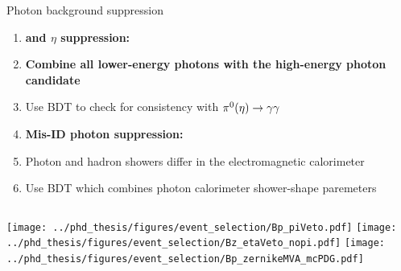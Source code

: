 \documentclass[xcolor=dvipsnames]{beamer}
\begin{document}
\begin{frame}{Photon background suppression}
   \centering\scriptsize
   \begin{enumerate}
      \item {\bf\large\piz and $\eta$ suppression:}\\
      \item[\ra] \textbf{Combine all lower-energy photons with the high-energy photon candidate}
      \item[\ra] Use BDT to check for consistency with $\pi^0(\eta)\rightarrow\gamma\gamma$\\
      \vspace{10pt}
      \item {\bf\large Mis-ID photon suppression:}\\
      \item[\ra] Photon and hadron showers differ in the electromagnetic calorimeter
      \item[\ra] Use BDT which combines photon calorimeter shower-shape paremeters 
  \end{enumerate}  
  \begin{columns}
   \texttt{[image: ../phd\_thesis/figures/event\_selection/Bp\_piVeto.pdf]}
   \texttt{[image: ../phd\_thesis/figures/event\_selection/Bz\_etaVeto\_nopi.pdf]}
   \texttt{[image: ../phd\_thesis/figures/event\_selection/Bp\_zernikeMVA\_mcPDG.pdf]}
\end{columns}


\end{frame}

\end{document}
